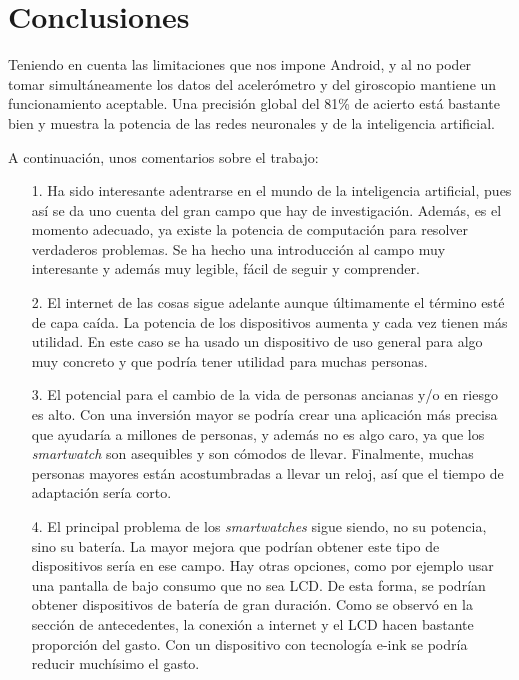 \documentclass[12pt]{book}
\numberwithin{equation}{section}
\begin{document}
\newpage
\chapter{Conclusiones}

Teniendo en cuenta las limitaciones que nos impone Android, y al no poder tomar simultáneamente los datos del acelerómetro y del giroscopio mantiene un funcionamiento aceptable. Una precisión global del 81\% de acierto está bastante bien y muestra la potencia de las redes neuronales y de la inteligencia artificial.

A continuación, unos comentarios sobre el trabajo:

\begin{enumerate}
\item[1.] Ha sido interesante adentrarse en el mundo de la inteligencia artificial, pues así se da uno cuenta del gran campo que hay de investigación. Además, es el momento adecuado, ya existe la potencia de computación para resolver verdaderos problemas. Se ha hecho una introducción al campo muy interesante y además muy legible, fácil de seguir y comprender.

\item[2.] El internet de las cosas sigue adelante aunque últimamente el término esté de capa caída. La potencia de los dispositivos aumenta y cada vez tienen más utilidad. En este caso se ha usado un dispositivo de uso general para algo muy concreto y que podría tener utilidad para muchas personas.

\item[3.] El potencial para el cambio de la vida de personas ancianas y/o en riesgo es alto. Con una inversión mayor se podría crear una aplicación más precisa que ayudaría a millones de personas, y además no es algo caro, ya que los \textit{smartwatch} son asequibles y son cómodos de llevar. Finalmente, muchas personas mayores están acostumbradas a llevar un reloj, así que el tiempo de adaptación sería corto.

\item[4.] El principal problema de los \textit{smartwatches} sigue siendo, no su potencia, sino su batería. La mayor mejora que podrían obtener este tipo de dispositivos sería en ese campo. Hay otras opciones, como por ejemplo usar una pantalla de bajo consumo que no sea LCD. De esta forma, se podrían obtener dispositivos de batería de gran duración. Como se observó en la sección de antecedentes, la conexión a internet y el LCD hacen bastante proporción del gasto. Con un dispositivo con tecnología e-ink se podría reducir muchísimo el gasto.


\end{enumerate}
\end{document}
